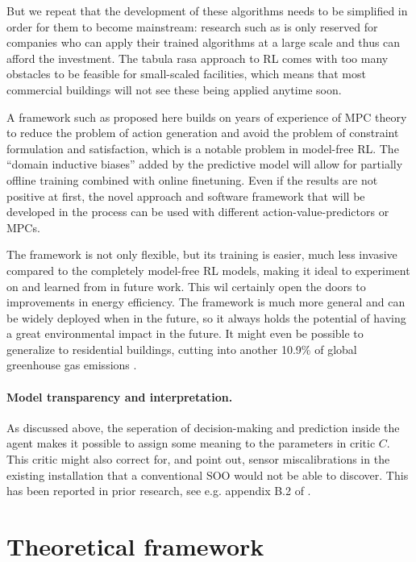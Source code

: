 \documentclass{article}
\theoremstyle{definition}
\theoremstyle{remark}
\begin{document}
But we repeat that the development of these algorithms needs to be simplified in order for them to become mainstream: research such as \cite{evans_gao_2016, luo2022controlling, gamble_gao_2018} is only reserved for companies who can apply their trained algorithms at a large scale and thus can afford the investment. The tabula rasa approach to RL comes with too many obstacles to be feasible for small-scaled facilities, which means that most commercial buildings will not see these being applied anytime soon.

A framework such as proposed here builds on years of experience of MPC theory to reduce the problem of action generation and avoid the problem of constraint formulation and satisfaction, which is a notable problem in model-free RL. The ``domain inductive biases'' added by the predictive model will allow for partially offline training combined with online finetuning. Even if the results are not positive at first, the novel approach and software framework that will be developed in the process can be used with different action-value-predictors or MPCs. 

The framework is not only flexible, but its training is easier, much less invasive compared to the completely model-free RL models, making it ideal to experiment on and learned from in future work. This wil certainly open the doors to improvements in energy efficiency. The framework is much more general and can be widely deployed when in the future, so it always holds the potential of having a great environmental impact in the future. It might even be possible to generalize to residential buildings, cutting into another 10.9\% of global greenhouse gas emissions \cite{owidco2andgreenhousegasemissions}.

\FloatBarrier

\paragraph{Model transparency and interpretation.}
As discussed above, the seperation of decision-making and prediction inside the agent makes it possible to assign some meaning to the parameters in critic $C$. This critic might also correct for, and point out, sensor miscalibrations in the existing installation that a conventional SOO would not be able to discover. This has been reported in prior research, see e.g. appendix B.2 of \cite{luo2022controlling}.

\section{Theoretical framework}
\end{document}
